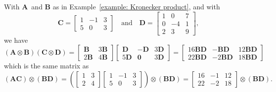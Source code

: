 \begin{example}
\newcommand{\bs}[1]{\boldsymbol{#1}}
With $\boldsymbol{A}$~and $\boldsymbol{B}$ as in 
Example~\ref{example: Kronecker product}, and with
\[
\boldsymbol{C}=\begin{bmatrix}1&-1&3\\ 5&0&3\end{bmatrix}
\quad\text{and}\quad
\boldsymbol{D}=\begin{bmatrix}1&0&7\\ 0&-4&1\\ 2&3&9\end{bmatrix},
\]
we have
\[
(\bs{A}\otimes\bs{B})(\bs{C}\otimes\bs{D})
    =\begin{bmatrix}
 \bs{B}&3\bs{B}\\
2\bs{B}&4\bs{B}\end{bmatrix}
\begin{bmatrix}
 \bs{D}&-\bs{D}&3\bs{D}\\
5\bs{D}& \bs{0}&3\bs{D}
\end{bmatrix}
=\begin{bmatrix}
16\bs{B}\bs{D}& -\bs{B}\bs{D}&12\bs{B}\bs{D}\\
22\bs{B}\bs{D}&-2\bs{B}\bs{D}&18\bs{B}\bs{D}
\end{bmatrix}
\]
which is the same matrix as
\[
(\bs{A}\bs{C})\otimes(\bs{B}\bs{D})
=\left(\begin{bmatrix}1&3\\ 2&4\end{bmatrix}
\begin{bmatrix}1&-1&3\\ 5&0&3\end{bmatrix}\right)\otimes(\bs{B}\bs{D})
=\begin{bmatrix}16&-1&12\\ 22&-2&18\end{bmatrix}\otimes(\bs{B}\bs{D}).
\]
\end{example}

